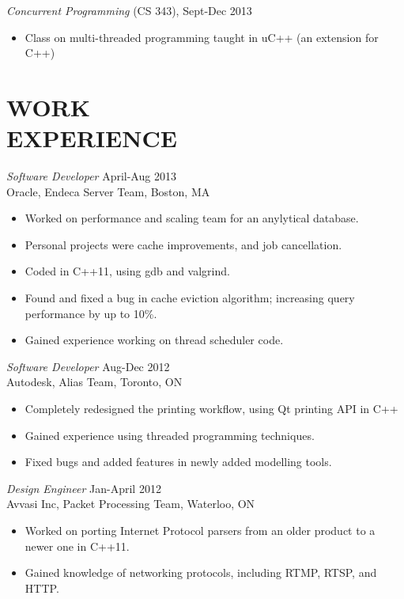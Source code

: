\documentclass[line,margin]{res}
\begin{document}
\begin{resume}
        {\sl Concurrent Programming} (CS 343), \hfill Sept-Dec 2013 \\
        \begin{itemize}
        \item Class on multi-threaded programming taught in uC++ (an extension for C++)
        \end{itemize}

\section{WORK \\ EXPERIENCE}
        {\sl Software Developer} \hfill April-Aug 2013 \\
        Oracle, Endeca Server Team, Boston, MA \\
        \begin{itemize}
        \item Worked on performance and scaling team for an anylytical database.
        \item Personal projects were cache improvements, and job cancellation.
        \item Coded in C++11, using gdb and valgrind.
        \item Found and fixed a bug in cache eviction algorithm; increasing query performance by up to 10\%.
        \item Gained experience working on thread scheduler code.
        \end{itemize}

        {\sl Software Developer} \hfill Aug-Dec 2012 \\
        Autodesk, Alias Team, Toronto, ON \\
        \begin{itemize}
        \item Completely redesigned the printing workflow, using Qt printing API in C++
        \item Gained experience using threaded programming techniques.
        \item Fixed bugs and added features in newly added modelling tools.
        \end{itemize}

        {\sl Design Engineer} \hfill Jan-April 2012 \\
        Avvasi Inc, Packet Processing Team, Waterloo, ON \\
        \begin{itemize}
        \item Worked on porting Internet Protocol parsers from an older product to a newer one in C++11.
        \item Gained knowledge of networking protocols, including RTMP, RTSP, and HTTP.
        \end{itemize}
\end{resume}
\end{document}
